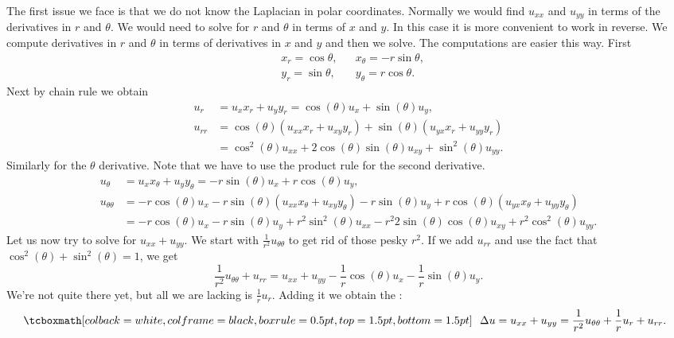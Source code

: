 The first issue we face is that we do not know the Laplacian
in polar coordinates.
Normally we would find $u_{xx}$ and $u_{yy}$ in terms of
the derivatives in $r$ and $\theta$.  We would need to solve
for $r$ and $\theta$ in terms of $x$ and $y$.  In this case
it is more convenient to work in
reverse.  We compute derivatives in $r$ and $\theta$ in terms
of derivatives in $x$ and $y$ and then we solve.  The
computations are easier this way.  First
\begin{equation*}
\begin{aligned}
& x_r = \cos \theta, & &
x_\theta = - r \sin \theta, \\
& y_r = \sin \theta, & &
y_\theta = r \cos \theta.
\end{aligned}
\end{equation*}
Next by chain rule we obtain
\begin{align*}
u_r & = u_x x_r + u_y y_r = \cos(\theta) u_x + \sin(\theta) u_y ,
\\
u_{rr} & =
\cos(\theta) ( u_{xx} x_r +u_{xy} y_r )
+ \sin(\theta) ( u_{yx} x_r +u_{yy} y_r )
\\
&
=
\cos^2(\theta) u_{xx} +
2 \cos(\theta)\sin(\theta) u_{xy} +
\sin^2(\theta) u_{yy} .
\end{align*}
Similarly for the $\theta$ derivative.  Note that we have to use
the product rule for the second derivative.
\begin{align*}
u_\theta & = u_x x_\theta + u_y y_\theta =
-r\sin(\theta) u_x + r\cos(\theta) u_y ,
\\
u_{\theta\theta} & =
-r\cos(\theta) u_x
-r\sin(\theta) (u_{xx} x_\theta + u_{xy} y_\theta)
-r\sin(\theta) u_y
+
r\cos(\theta) (u_{yx} x_\theta + u_{yy} y_\theta)
\\
& = 
-r\cos(\theta) u_x
-r\sin(\theta) u_y
+r^2 \sin^2(\theta) u_{xx}
-r^2 2\sin(\theta)\cos(\theta) u_{xy}
+r^2 \cos^2(\theta) u_{yy} .
\end{align*}
Let us now try to solve for $u_{xx} + u_{yy}$.  We start with
$\frac{1}{r^2} u_{\theta\theta}$ to get rid of those pesky $r^2$.
If we add $u_{rr}$
and use the fact that $\cos^2(\theta) +\sin^2(\theta) = 1$, we get
\begin{equation*}
\frac{1}{r^2} u_{\theta\theta}
+
u_{rr}
=
u_{xx} + u_{yy} - \frac{1}{r} \cos(\theta) u_x - \frac{1}{r} \sin(\theta)
u_y .
\end{equation*}
We're not quite there yet, but all we are lacking is 
$\frac{1}{r} u_r$.  Adding it we obtain the
\emph{}:
\begin{equation*}
\mybxbg{~~
\Delta u 
=
u_{xx} + u_{yy} =
\frac{1}{r^2} u_{\theta\theta}
+
\frac{1}{r} u_{r}
+
u_{rr} .
~~}
\end{equation*}

